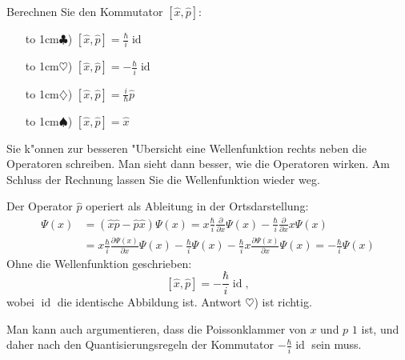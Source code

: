 Berechnen Sie den Kommutator $[\hat x,\hat p]$:
\begin{itemize}
\item[\hbox to 1cm{$\clubsuit$)\hfill}]
$[\hat x,\hat p]=\frac{\hbar}{i}\operatorname{id}$
\item[\hbox to 1cm{$\heartsuit$)\hfill}]
$[\hat x,\hat p]=-\frac{\hbar}{i}\operatorname{id}$
\item[\hbox to 1cm{$\diamondsuit$)\hfill}]
$[\hat x,\hat p]=\frac{i}{\hbar}\hat p$
\item[\hbox to 1cm{$\spadesuit$)\hfill}]
$[\hat x,\hat p]=\hat x$
\end{itemize}

\begin{hinweis}
Sie k"onnen zur besseren "Ubersicht eine Wellenfunktion rechts neben
die Operatoren schreiben. Man sieht dann besser, wie die Operatoren wirken.
Am Schluss der Rechnung lassen Sie die Wellenfunktion wieder weg.
\end{hinweis}

\begin{loesung}
Der Operator $\hat p$ operiert als Ableitung in der Ortsdarstellung:
\begin{align*}
[\hat x,\hat p]\Psi(x)
&=
(\hat x\hat p-\hat p\hat x)\Psi(x)
=
x\frac{\hbar}{i}\frac{\partial}{\partial x}\Psi(x)
-
\frac{\hbar}{i}\frac{\partial}{\partial x}x\Psi(x)
\\
&=
x\frac{\hbar}{i}\frac{\partial\Psi(x)}{\partial x}\Psi(x)
-
\frac{\hbar}{i}\Psi(x)
-
\frac{\hbar}{i}x\frac{\partial \Psi(x)}{\partial x}\Psi(x)
=
-\frac{\hbar}{i}\Psi(x)
\end{align*}
Ohne die Wellenfunktion geschrieben:
\[
[\hat x,\hat p]=-\frac{\hbar}{i}\operatorname{id},
\]
wobei $\operatorname{id}$ die identische Abbildung ist.
Antwort $\heartsuit$) ist richtig.

Man kann auch argumentieren, dass die Poissonklammer von $x$ und $p$ $1$ ist,
und daher nach den Quantisierungsregeln der Kommutator 
$-\frac{\hbar}{i}\operatorname{id}$ sein muss.
\end{loesung}


